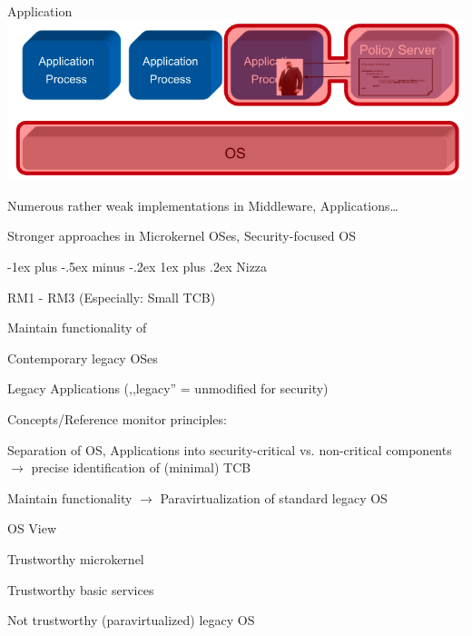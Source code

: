 \documentclass[a4paper]{article}
\makeatletter
\renewcommand{\subsubsection}{\@startsection{subsubsection}{3}{0mm}%
                {-1ex plus -.5ex minus -.2ex}%
                {1ex plus .2ex}%
                {\normalfont\small\bfseries}}
\makeatother
\begin{document}
\begin{multicols}{3}
\begin{multicols}{2}
        Application \includegraphics[width=\linewidth]{Assets/Systemsicherheit-policy-controlled-app-tcp-implementation.png}
    \end{multicols}
    \begin{itemize*}
        \item Numerous rather weak implementations in Middleware, Applications\dots
        \item Stronger approaches in Microkernel OSes, Security-focused OS
    \end{itemize*}

    \subsubsection{Nizza}
    \begin{itemize*}
        \item RM1 - RM3 (Especially: Small TCB)
        \item Maintain functionality of
        \begin{itemize*}
            \item Contemporary legacy OSes
            \item Legacy Applications (,,legacy'' = unmodified for security)
        \end{itemize*}
    \end{itemize*}

    Concepts/Reference monitor principles:
    \begin{itemize*}
        \item Separation of OS, Applications into security-critical vs. non-critical components $\rightarrow$ precise identification of (minimal) TCB
        \item Maintain functionality $\rightarrow$ Paravirtualization of standard legacy OS
    \end{itemize*}

    OS View
    \begin{itemize*}
        \item Trustworthy microkernel
        \item Trustworthy basic services
        \item Not trustworthy (paravirtualized) legacy OS
    \end{itemize*}


\end{multicols}
\end{document}

